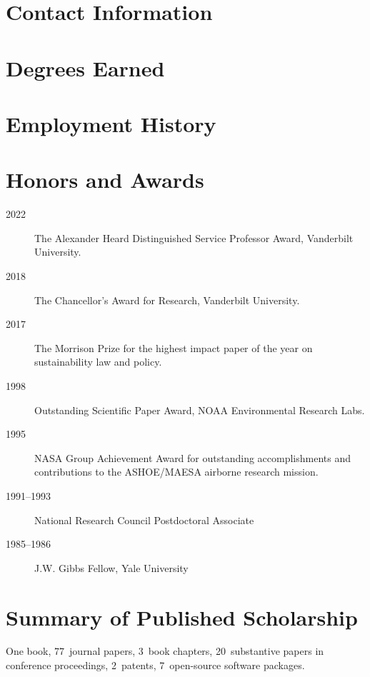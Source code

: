 \documentclass[10pt]{article}
\title{}
\date{\thedate}
\author{Jonathan Mark Gilligan}
\begin{document}
\maketitle

\section{Contact Information}


\section{Degrees Earned}
\begin{description}
	
\end{description}
\section{Employment History}


\section{Honors and Awards}
\begin{description}
\item[2022] The Alexander Heard Distinguished Service Professor Award,
  Vanderbilt University.
\item[2018] The Chancellor's Award for Research, Vanderbilt University.
\item[2017] The Morrison Prize for the highest impact paper of the year
  on sustainability law and policy.
\item[1998] Outstanding Scientific Paper Award, NOAA Environmental Research
  Labs.
\item[1995] NASA Group Achievement Award for outstanding accomplishments and
  contributions to the ASHOE/MAESA airborne research mission.
\item[1991--1993] National Research Council Postdoctoral Associate
\item[1985--1986] J.W. Gibbs Fellow, Yale University
\end{description}

\section{Summary of Published Scholarship}
    One book, 77~journal papers, 3~book chapters, 20~substantive papers in
    conference proceedings, 2~patents, 7~open-source software packages.
\end{document}
